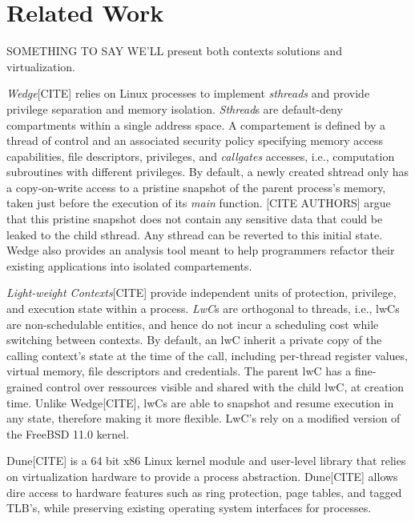 \chapter{Related Work}
SOMETHING TO SAY WE'LL present both contexts solutions and virtualization.

\textit{Wedge}[CITE] relies on Linux processes to implement \textit{sthreads} and provide 
privilege separation and memory isolation.
\textit{Sthread}s are default-deny compartments within a single address space.
A compartement is defined by a thread of control and an associated security policy specifying
memory access capabilities, file descriptors, privileges, and \textit{callgates} accesses, i.e., computation subroutines with different privileges.
By default, a newly created shtread only has a copy-on-write access to a pristine snapshot of the parent process's memory, taken just before the execution of its \textit{main} function.
[CITE AUTHORS] argue that this pristine snapshot does not contain any sensitive data that could be leaked
to the child sthread.
Any sthread can be reverted to this initial state.
Wedge also provides an analysis tool meant to help programmers refactor their existing applications into isolated compartements.

\textit{Light-weight Contexts}[CITE] provide independent units of protection, privilege, and execution state within a process.
\textit{LwC}s are orthogonal to threads, i.e., lwCs are non-schedulable entities, and hence do not incur a scheduling cost while switching between contexts.
By default, an lwC inherit a private copy of the calling context's state at the time of the call, including
per-thread register values, virtual memory, file descriptors and credentials.
The parent lwC has a fine-grained control over ressources visible and shared with the child lwC, at creation time.
Unlike Wedge[CITE], lwCs are able to snapshot and resume execution in any state, therefore making it more flexible.
LwC's rely on a modified version of the FreeBSD 11.0 kernel.


Dune[CITE] is a 64 bit x86 Linux kernel module and user-level library that relies on virtualization hardware to provide a process abstraction.
Dune[CITE] allows dire access to hardware features such as ring protection, page tables, and tagged TLB's, while preserving existing operating system interfaces for processes.
